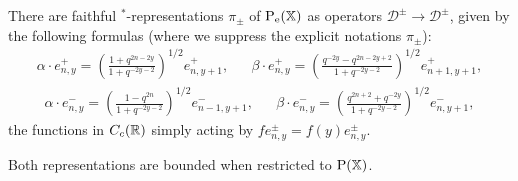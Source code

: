 \begin{Lem} There are faithful $^*$-representations $\pi_{\pm}$ of $\operatorname{\mathrm{P}}_{\operatorname{\mathrm{e}}}(\mathbb{X})$ as operators $\mathscr{D}^{\pm}\rightarrow \mathscr{D}^{\pm}$, given by the following formulas (where we suppress the explicit notations $\pi_{\pm}$): \begin{align*} \alpha\cdot e_{n,y}^+ = \left(\frac{1+q^{2n-2y}}{1+q^{-2y-2}}\right)^{1/2}e_{n,y+1}^+,&& \beta\cdot e_{n,y}^+ = \left(\frac{q^{-2y}-q^{2n-2y+2}}{1+q^{-2y-2}}\right)^{1/2}e_{n+1,y+1}^+,\end{align*}
\begin{align*} \alpha\cdot e_{n,y}^- = \left(\frac{1-q^{2n}}{1+q^{-2y-2}}\right)^{1/2}e_{n-1,y+1}^-,&& \beta\cdot e_{n,y}^- = \left(\frac{q^{2n+2}+q^{-2y}}{1+q^{-2y-2}}\right)^{1/2}e_{n,y+1}^-,\end{align*} the functions in $C_c(\mathbb{R})$ simply acting by $fe_{n,y}^{\pm}= f(y)e_{n,y}^{\pm}$.

Both representations are bounded when restricted to $\operatorname{\mathrm{P}}(\mathbb{X})$.
\end{Lem}



